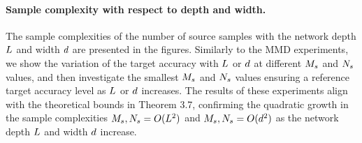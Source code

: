 \documentclass[review,supplement,onefignum,onetabnum]{siamonline250211}
\begin{document}
\begin{table}[ht]
    \centering
    \renewcommand{\arraystretch}{1.2}
    \caption{Experimental configurations for adversarial domain adaptation experiments.}
    \label{tab:adv-hyperparams-supp}
\end{table}

\paragraph{Sample complexity with respect to depth and width.}
The sample complexities of the number of source samples with the network depth $L$ and  width ${d}$ are presented in the figures. Similarly to the MMD experiments, we show the variation of the target accuracy with $L$ or ${d}$ at different $M_s$ and $N_s$ values, and then investigate the smallest $M_s$ and $N_s$ values ensuring a reference target accuracy level as $L$ or ${d}$ increases. The results of these experiments align with the theoretical bounds in Theorem 3.7, confirming the quadratic growth in the sample complexities $M_s, N_s=O(L^2)$  and $M_s, N_s = O({d}^2)$ as the network depth $L$ and width ${d}$ increase.
\end{document}
